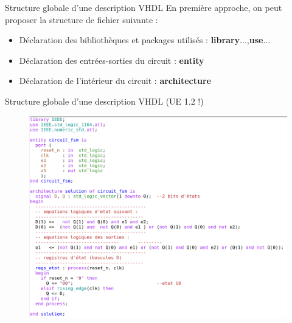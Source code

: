 \documentclass[xcolor=table]{beamer} %
\begin{document}

\begin{frame}{Structure globale d'une description VHDL}
  En première approche, on peut proposer la structure de fichier suivante :
  \begin{itemize}
    \item Déclaration des bibliothèques et packages utilisés : \textbf{library}...,\textbf{use}...
    \item Déclaration des entrées-sorties du circuit : \textbf{entity}
    \item Déclaration de l'intérieur du circuit : \textbf{architecture}
  \end{itemize}
\end{frame}

\begin{frame}{Structure globale d'une description VHDL (UE 1.2 !)}
  \begin{figure}[h]
    \centering
    \includegraphics[scale=0.3]{./figures/vhdl_1.png}
  \end{figure}
\end{frame}
\end{document}
